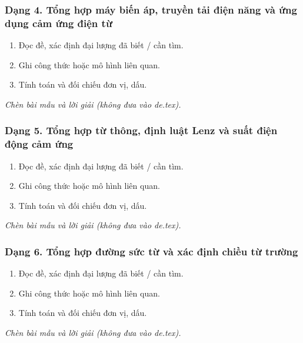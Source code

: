 \subsubsection{Dạng 4. Tổng hợp máy biến áp, truyền tải điện năng và ứng dụng cảm ứng điện từ}
\begin{phuongphap}
\begin{enumerate}
\item Đọc đề, xác định đại lượng đã biết / cần tìm.
\item Ghi công thức hoặc mô hình liên quan.
\item Tính toán và đối chiếu đơn vị, dấu.
\end{enumerate}
\end{phuongphap}
\begin{vidumau}
\textit{Chèn bài mẫu và lời giải (không đưa vào de.tex).}
\end{vidumau}

\subsubsection{Dạng 5. Tổng hợp từ thông, định luật Lenz và suất điện động cảm ứng}
\begin{phuongphap}
\begin{enumerate}
\item Đọc đề, xác định đại lượng đã biết / cần tìm.
\item Ghi công thức hoặc mô hình liên quan.
\item Tính toán và đối chiếu đơn vị, dấu.
\end{enumerate}
\end{phuongphap}
\begin{vidumau}
\textit{Chèn bài mẫu và lời giải (không đưa vào de.tex).}
\end{vidumau}

\subsubsection{Dạng 6. Tổng hợp đường sức từ và xác định chiều từ trường}
\begin{phuongphap}
\begin{enumerate}
\item Đọc đề, xác định đại lượng đã biết / cần tìm.
\item Ghi công thức hoặc mô hình liên quan.
\item Tính toán và đối chiếu đơn vị, dấu.
\end{enumerate}
\end{phuongphap}
\begin{vidumau}
\textit{Chèn bài mẫu và lời giải (không đưa vào de.tex).}
\end{vidumau}

